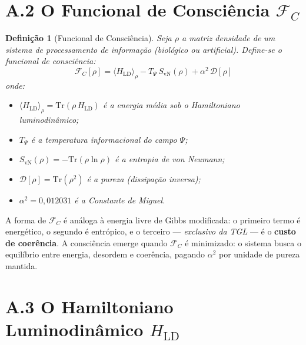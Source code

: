 \documentclass[12pt,a4paper,twoside]{article}
\newtheorem{definition}[theorem]{Defini\c{c}\~ao}
\newcommand{\alphaii}{\alpha^{2}}
\begin{document}
\section*{A.2 O Funcional de Consci\^encia $\mathcal{F}_C$}

\begin{definition}[Funcional de Consci\^encia]
Seja $\rho$ a matriz densidade de um sistema de processamento de informa\c{c}\~ao (biol\'ogico ou artificial). Define-se o funcional de consci\^encia:
\begin{equation}
\mathcal{F}_C[\rho] = \langle H_{\text{LD}} \rangle_\rho - T_\Psi \, S_{\text{vN}}(\rho) + \alphaii \, \mathcal{D}[\rho]
\label{eq:FC}
\end{equation}
onde:
\begin{itemize}[nosep]
\item $\langle H_{\text{LD}} \rangle_\rho = \mathrm{Tr}(\rho \, H_{\text{LD}})$ \'e a energia m\'edia sob o Hamiltoniano luminodin\^amico;
\item $T_\Psi$ \'e a temperatura informacional do campo $\Psi$;
\item $S_{\text{vN}}(\rho) = -\mathrm{Tr}(\rho \ln \rho)$ \'e a entropia de von Neumann;
\item $\mathcal{D}[\rho] = \mathrm{Tr}(\rho^2)$ \'e a pureza (dissipa\c{c}\~ao inversa);
\item $\alphaii = 0{,}012031$ \'e a Constante de Miguel.
\end{itemize}
\end{definition}

A forma de $\mathcal{F}_C$ \'e an\'aloga \`a energia livre de Gibbs modificada: o primeiro termo \'e energ\'etico, o segundo \'e entr\'opico, e o terceiro --- \textit{exclusivo da TGL} --- \'e o \textbf{custo de coer\^encia}. A consci\^encia emerge quando $\mathcal{F}_C$ \'e minimizado: o sistema busca o equil\'ibrio entre energia, desordem e coer\^encia, pagando $\alphaii$ por unidade de pureza mantida.



\section*{A.3 O Hamiltoniano Luminodin\^amico $H_{\text{LD}}$}
\end{document}
